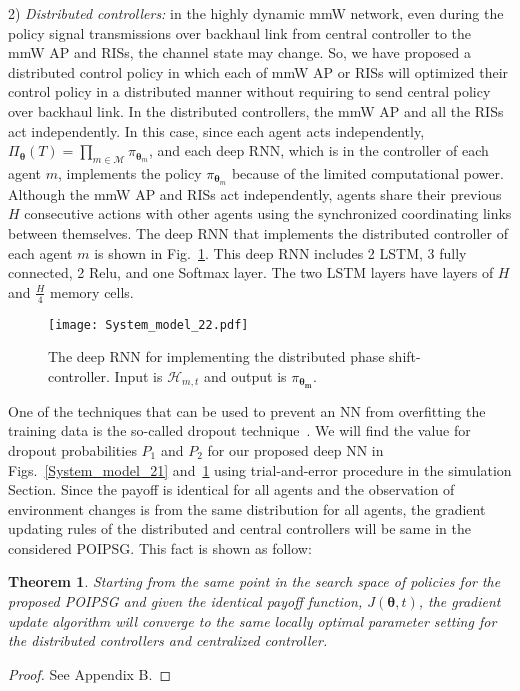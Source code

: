 \documentclass[conference]{IEEEtran}
\newtheorem{theorem}{\bf Theorem}
\begin{document}
2) \emph{Distributed controllers:}
in the highly dynamic mmW network, even during the policy signal transmissions over backhaul link from central controller to the mmW AP and RISs, the channel state may change. So, we have proposed a distributed control policy in which each of mmW AP or RISs will optimized their control policy in a distributed manner without requiring to send central policy over backhaul link. In the distributed controllers, the mmW AP and all the RISs act independently. In this case, since each agent acts independently, $\Pi_{\boldsymbol{\theta}}(T)=\prod_{m\in \mathcal{M}} \pi_{\boldsymbol{\theta}_m}$, and each deep RNN, which is in the controller of each agent $m$, implements the policy $\pi_{\boldsymbol{\theta}_m}$ because of the limited computational power. Although the mmW AP and RISs act independently, agents share their previous $H$ consecutive actions with other agents  using the synchronized coordinating links between themselves. The deep RNN that implements the distributed controller of each agent $m$ is shown in Fig.~\ref{System_model_22}. This deep RNN includes 2 LSTM, 3 fully connected, 2 Relu, and one Softmax layer. The two LSTM layers have layers of $H$ and $\frac{H}{4}$ memory cells.
\begin{figure}[!t]
	\begin{center}
		\texttt{[image: System\_model\_22.pdf]}		\vspace{-0.4cm}
		\caption{ \small The deep RNN for implementing the distributed phase shift-controller. Input is $\mathcal{H}_{m,t}$ and output is $\pi_{\boldsymbol{\theta_m}}$.
\vspace{-1cm}}
		\label{System_model_22}
	\end{center}
\end{figure}

One of the techniques that can be used to prevent an NN from overfitting the training data is the so-called dropout technique~\cite{Goodfellow-2016}. We will find the value for dropout probabilities $P_1$ and $P_2$ for our proposed deep NN in Figs.~\ref{System_model_21} and~\ref{System_model_22} using trial-and-error procedure in the simulation Section. Since the payoff is identical for all agents and the observation of environment changes is from the same distribution for all agents, the gradient updating rules of the distributed and central controllers will be same in the considered POIPSG. This fact is shown as follow:
\begin{theorem}
\textnormal{Starting from the same point in the search space of policies for the proposed POIPSG and given the  identical payoff function, $J(\boldsymbol{\theta},t)$, the gradient update algorithm will converge to the same locally optimal parameter setting for the distributed controllers and centralized controller.}
\end{theorem}
\begin{proof}
See Appendix B.
\end{proof}
\end{document}
